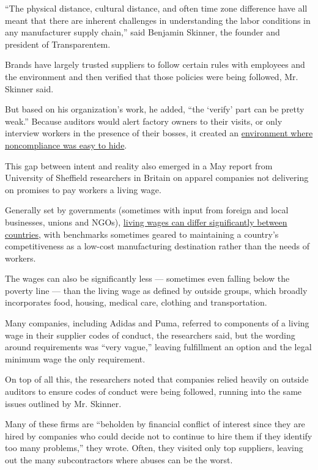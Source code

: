 ``The physical distance, cultural distance, and often time zone
difference have all meant that there are inherent challenges in
understanding the labor conditions in any manufacturer supply chain,''
said Benjamin Skinner, the founder and president of Transparentem.

Brands have largely trusted suppliers to follow certain rules with
employees and the environment and then verified that those policies were
being followed, Mr. Skinner said.

But based on his organization's work, he added, ``the `verify' part can
be pretty weak.'' Because auditors would alert factory owners to their
visits, or only interview workers in the presence of their bosses, it
created an
\href{https://www.nytimes.com/2019/02/06/fashion/india-fast-fashion-homeworkers.html}{environment
where noncompliance was easy to hide}.

This gap between intent and reality also emerged in a May report from
University of Sheffield researchers in Britain on apparel companies not
delivering on promises to pay workers a living wage.

Generally set by governments (sometimes with input from foreign and
local businesses, unions and NGOs),
\href{https://www.nytimes.com/2019/06/05/smarter-living/what-a-living-wage-actually-means.html}{living
wages can differ significantly between countries}, with benchmarks
sometimes geared to maintaining a country's competitiveness as a
low-cost manufacturing destination rather than the needs of workers.

The wages can also be significantly less --- sometimes even falling
below the poverty line --- than the living wage as defined by outside
groups, which broadly incorporates food, housing, medical care, clothing
and transportation.

Many companies, including Adidas and Puma, referred to components of a
living wage in their supplier codes of conduct, the researchers said,
but the wording around requirements was ``very vague,'' leaving
fulfillment an option and the legal minimum wage the only requirement.

On top of all this, the researchers noted that companies relied heavily
on outside auditors to ensure codes of conduct were being followed,
running into the same issues outlined by Mr. Skinner.

Many of these firms are ``beholden by financial conflict of interest
since they are hired by companies who could decide not to continue to
hire them if they identify too many problems,'' they wrote. Often, they
visited only top suppliers, leaving out the many subcontractors where
abuses can be the worst.

